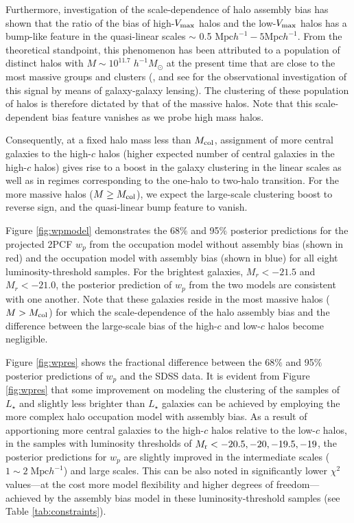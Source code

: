 \documentclass[12pt, preprint]{aastex}
\begin{document}
Furthermore, investigation of the scale-dependence of halo assembly bias has shown that the ratio of the bias of high-$V_{\rm max}$ halos and the low-$V_{\rm max}$ halos has a bump-like feature in the quasi-linear scales $\sim$ 0.5 $\mathrm{Mpc}h^{-1}-5\mathrm{Mpc}h^{-1}$. From the theoretical standpoint, this phenomenon has been attributed to a population of distinct halos with $M \sim 10^11.7 \; h^{-1}M_{\odot}$ at the present time that are close to the most massive groups and clusters (\citealt{sunayama2016}, and see \citealt{more2016} for the observational investigation of this signal by means of galaxy-galaxy lensing). The clustering of these population of halos is therefore dictated by that of the massive halos. Note that this scale-dependent bias feature vanishes as we probe high mass halos. 

Consequently, at a fixed halo mass less than $M_{\rm col}$, assignment of more central galaxies to the high-$c$ halos (higher expected number of central galaxies in the high-$c$ halos) gives rise to a boost in the galaxy clustering in the linear scales as well as in regimes corresponding to the one-halo to two-halo transition. For the more massive halos ($M \geq M_{\rm col}$), we expect the large-scale clustering boost to reverse sign, and the quasi-linear bump feature to vanish.  

Figure \ref{fig:wpmodel} demonstrates the 68$\%$ and 95$\%$ posterior predictions for the projected 2PCF $w_{p}$ from the occupation model without assembly bias (shown in red) and the occupation model with assembly bias (shown in blue) for all eight luminosity-threshold samples. For the brightest galaxies, $M_{r} < -21.5$ and $M_{r} < -21.0$, the posterior prediction of $w_{p}$ from the two models are consistent with one another. Note that these galaxies reside in the most massive halos ($M > M_{\rm col}$) for which the scale-dependence of the halo assembly bias and the difference between the large-scale bias of the high-$c$ and low-$c$ halos become negligible. 

Figure \ref{fig:wpres} shows the fractional difference between the 68$\%$ and 95$\%$ posterior predictions of $w_p$ and the SDSS data. It is evident from Figure \ref{fig:wpres} that some improvement on modeling the clustering of the samples of $L_{\star}$ and slightly less brighter than $L_{\star}$ galaxies can be achieved by employing the more complex halo occupation model with assembly bias. As a result of apportioning more central galaxies to the high-$c$ halos relative to the low-$c$ halos, in the samples with luminosity thresholds of $M_{\rm r}<-20.5, -20, -19.5, -19$, the posterior predictions for $w_{p}$ are slightly improved in the intermediate scales ($1\sim 2 \; \mathrm{Mpc} h^{-1}$) and large scales. This can be also noted in significantly lower $\chi^{2}$ values---at the cost more model flexibility and higher degrees of freedom---achieved by the assembly bias model in these luminosity-threshold samples (see Table \ref{tab:constraints}).  
\end{document}

